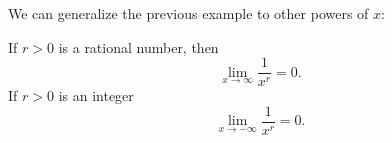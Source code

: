 \begin{frame}
We can generalize the previous example to other powers of $x$:
\begin{theorem}
If $r > 0$ is a rational number, then
\[
\lim_{x\to\infty} \frac{1}{x^r} = 0.
\]
If $r > 0$ is an integer
\[
\lim_{x\to - \infty} \frac{1}{x^r} = 0.
\]
\end{theorem}
\end{frame}
